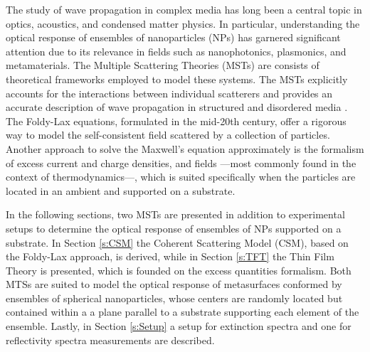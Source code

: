 
The study of wave propagation in complex media has long been a central topic in optics, acoustics, and condensed matter physics. In particular, understanding the optical response of ensembles of nanoparticles (NPs) has garnered significant attention due to its relevance in fields such as nanophotonics, plasmonics, and metamaterials. The Multiple Scattering Theories (MSTs)  are consists of theoretical frameworks  employed to model these systems. The MSTs explicitly accounts for the interactions between individual scatterers and provides an accurate description of wave propagation in structured and disordered media \cite{loiko_monolayers_1998,barrera1991optical,reyes2018analytical}. The Foldy-Lax equations, formulated in the mid-20th century, offer a rigorous way to model the self-consistent field scattered by a collection of particles. Another approach to solve the Maxwell's equation approximately is the formalism of excess current and charge densities, and fields ---most commonly found in the context of thermodynamics---, which is suited specifically when the particles are located in an ambient and supported on a substrate.

In the following sections, two MSTs are presented in addition to experimental setups to determine the optical response of ensembles of NPs supported on a substrate. In Section \ref{s:CSM} the Coherent Scattering Model (CSM), based on the Foldy-Lax approach, is derived, while in Section \ref{s:TFT} the Thin Film Theory is presented, which is founded on the excess quantities formalism. Both MTSs are suited to model the optical response of metasurfaces conformed by ensembles of spherical nanoparticles, whose centers are randomly located but contained within a a plane parallel to a substrate supporting each element of the ensemble. Lastly, in Section \ref{s:Setup} a setup for extinction spectra and one for reflectivity spectra  measurements are described.
